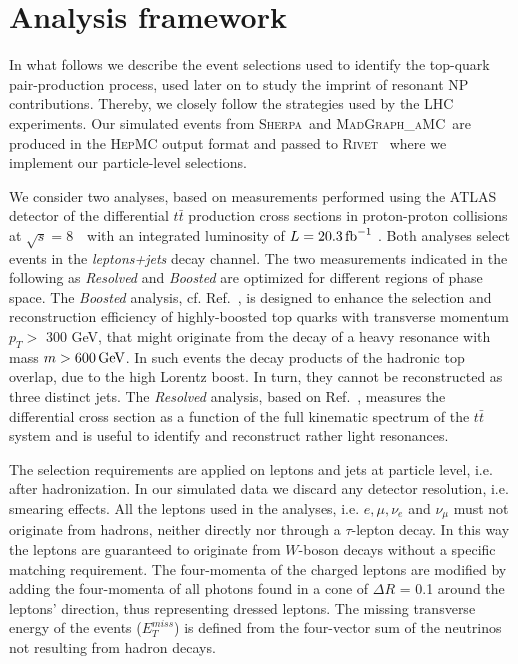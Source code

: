 \documentclass[aps,prd,amsmath,amssymb,superscriptaddress, preprintnumbers,preprint,nofootinbib,a4paper]{revtex4}
\makeatletter
\newcommand{\TeV}{\,\text{TeV}}
\newcommand{\ifb}{\,{\rm fb}^{-1}}
\newcommand{\ttb}{t\bar{t}}
\def\Sherpa{\textsc{Sherpa}}
\def\mg5{\textsc{MadGraph\_aMC\@NLO}}
\def\sec#1{{sec.~(\ref{#1})}}
\newcommand{\com}[1]{{\color{red}{ #1 }}}
\makeatother
\begin{document}


\section{Analysis framework}
\label{sec:analysis}

In what follows we describe the event selections used to identify the top-quark pair-production
process, used later on to study the imprint of resonant NP contributions. Thereby,
we closely follow the strategies used by the LHC experiments. Our simulated events from
\Sherpa\ and \mg5\ are produced in the \textsc{HepMC} output format \cite{Dobbs:2001ck} and
passed to \textsc{Rivet}~\cite{Buckley:2010ar} where we implement our particle-level selections. 

We consider two analyses, based on measurements performed using the ATLAS detector of the
differential $\ttb$ production cross sections in proton-proton collisions at $\sqrt{s} = 8 $ \TeV\
with an integrated luminosity of $L=20.3\ifb$ 
\cite{Aad:2015hna,Aad:2015mbv}.
Both analyses select events in the \emph{leptons+jets} decay channel. The two measurements indicated
in the following as \emph{Resolved} and \emph{Boosted} are optimized for different regions
of phase space. The \emph{Boosted} analysis, cf. Ref.~\cite{Aad:2015hna}, is designed to
enhance the selection and reconstruction efficiency of highly-boosted top quarks with transverse
momentum $p_T > $ 300 GeV, that might originate from the decay of a heavy resonance with
mass $m> 600\,{\rm GeV}$. In such events the decay products of the hadronic top overlap, due to
the high Lorentz boost. In turn, they cannot be reconstructed as three distinct jets. The
\emph{Resolved} analysis, based on Ref.~\cite{Aad:2015mbv}, measures the differential cross section
as a function of the full kinematic spectrum of the $\ttb$ system and is useful to identify and
reconstruct rather light resonances.

The selection requirements are applied on leptons and jets at particle level, i.e. after hadronization.
In our simulated data we discard any detector resolution, i.e. smearing effects. All the leptons used
in the analyses, i.e. $e, \mu, \nu_{e}$ and $\nu_{\mu}$ must not originate from hadrons, neither directly
nor through a $\tau$-lepton decay. In this way the leptons are guaranteed to originate from $W$-boson
decays without a specific matching requirement. The four-momenta of the charged leptons are modified by
adding the four-momenta of all photons found in a cone of $\Delta R$ = 0.1 around the leptons'
direction, thus representing dressed leptons. The missing transverse energy of the events ($E_T^{miss}$)
is defined from the four-vector sum of the neutrinos not resulting from hadron decays.
\end{document}

